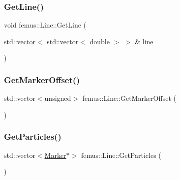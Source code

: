 \mbox{\label{classfemus_1_1_line_a0623915f9f27153ef5e477b3a566256d}} 
\subsubsection{\texorpdfstring{Get\+Line()}{GetLine()}}
{\footnotesize\ttfamily void femus\+::\+Line\+::\+Get\+Line (\begin{DoxyParamCaption}\item[{std\+::vector$<$ std\+::vector$<$ double $>$ $>$ \&}]{line }\end{DoxyParamCaption})\hspace{0.3cm}{\ttfamily [inline]}}

\mbox{\label{classfemus_1_1_line_ac2e1543fbce24c1cee46ed57b3346274}} 
\subsubsection{\texorpdfstring{Get\+Marker\+Offset()}{GetMarkerOffset()}}
{\footnotesize\ttfamily std\+::vector$<$unsigned$>$ femus\+::\+Line\+::\+Get\+Marker\+Offset (\begin{DoxyParamCaption}{ }\end{DoxyParamCaption})\hspace{0.3cm}{\ttfamily [inline]}}

\mbox{\label{classfemus_1_1_line_a2e4c6573a390a51a6d5ae4f98d274c8c}} 
\subsubsection{\texorpdfstring{Get\+Particles()}{GetParticles()}}
{\footnotesize\ttfamily std\+::vector$<$\mbox{\hyperlink{classfemus_1_1_marker}{Marker}}$\ast$$>$ femus\+::\+Line\+::\+Get\+Particles (\begin{DoxyParamCaption}{ }\end{DoxyParamCaption})\hspace{0.3cm}{\ttfamily [inline]}}

